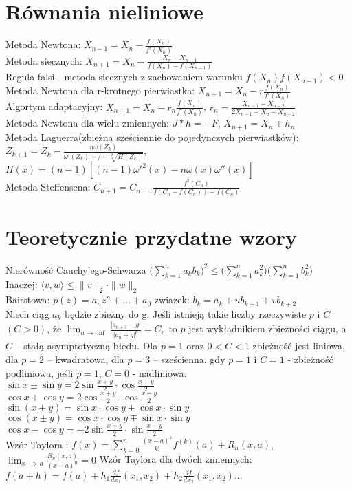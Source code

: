 \documentclass[a4paper,twocolumn]{article}
\begin{document}
\section{Równania nieliniowe}
Metoda Newtona: $X_{n+1}  = X_n - \frac{f(X_n)}{f'(X_n)}$\\
Metoda siecznych: $X_{n+1}  = X_n - \frac{X_n - X_{n-1}}{f(X_n)- f(X_{n-1})}$\\
Regula falsi - metoda siecznych z zachowaniem warunku $f(X_n)f(X_{n-1})<0$
Metoda Newtona dla r-krotnego pierwiastka: $X_{n+1}  = X_n - r\frac{f(X_n)}{f'(X_n)}$\\
Algortym adaptacyjny: $X_{n+1}  = X_n - r_n\frac{f(X_n)}{f'(X_n)}$, $r_n = \frac{X_{n-1} - X_{n-2}}{2X_{n-1} - X_n - X_{n-2}}$\\
Metoda Newtona dla wielu zmiennych: $J*h = -F$,  $X_{n+1} = X_n + h_n$\\
Metoda Laguerra(zbieżna sześciennie do pojedynczych pierwiastków): \\ $Z_{k+1} = Z_k - \frac{n\omega (Z_k)}{\omega '(Z_k) +/- \sqrt[2]{H(Z_k)}}$,\\ $H(x) = (n-1)[(n-1) \omega '^2(x) - n\omega (x) \omega ''(x)]$\\
Metoda Steffensena: $C_{n+1} = C_n - \frac{f^2(C_n)}{f(C_n + f(C_n)) - f(C_n)}$

\section{Teoretycznie przydatne wzory}

Nierówność Cauchy'ego-Schwarza $ \Big(\sum_{k=1}^{n} a_k b_k\Big)^2 \leq \Big(\sum_{k=1}^{n} a_k^2\Big)\Big(\sum_{k=1}^{n} b_k^2\Big) $ \\
Inaczej: $\langle v, w\rangle \leq \|v\|_2\cdot \|w\|_2$\\
Bairstowa: $p(z)=a_nz^n+\dots+a_0$
zwiazek: $b_k=a_k+ub_{k+1}+vb_{k+2}$\\
Niech ciąg $a_k$ będzie zbieżny do g. Jeśli istnieją takie liczby rzeczywiste $p$ i $C$ $(C > 0)$, że
$\lim_{n \rightarrow \inf}{\frac{|{a_{n+1}-g}|}{|{a_n - g}|^p}} = C, $
to $p$ jest wykładnikiem zbieżności ciągu, a $C$ – stałą
asymptotyczną błędu. Dla $p = 1$ oraz $0 < C < 1$ zbieżność jest
liniowa, dla $p = 2$ – kwadratowa, dla $p = 3$ – sześcienna.
gdy $p = 1$ i $C = 1$ - zbieżność podliniowa, jeśli $p = 1$, $C = 0$ - nadliniowa.\\
${\displaystyle \sin x\pm \sin y=2\sin {\frac {x\pm y}{2}}\cdot \cos {\frac {x\mp y}{2}}} $\\
$\cos x+\cos y=2\cos {\frac  {x+y}2}\cdot \cos {\frac  {x-y}2}$\\
${\displaystyle \sin(x\pm y)=\sin x\cdot \cos y\pm \cos x\cdot \sin y}$\\
${\displaystyle \cos(x\pm y)=\cos x\cdot \cos y\mp \sin x\cdot \sin y} $\\
$\cos x-\cos y=-2\sin {\frac  {x+y}2}\cdot \sin {\frac  {x-y}2}$\\
Wzór Taylora : $f(x) = \sum_{k=0}^n \frac{(x-a)^k}{k!}f^{(k)}(a) + R_n(x, a)$, $\lim_{x->a} \frac{R_n(x, a)}{(x-a)^n} = 0$
Wzór Taylora dla dwóch zmiennych: $f(a + h) = f(a) + h_1 \frac{df}{dx_1}(x_1, x_2) + h_2 \frac{df}{dx_2}(x_1, x_2)... $\\
\end{document}
